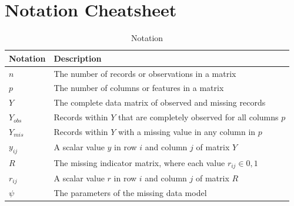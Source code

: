 \documentclass[12pt,oneside]{chicagocapstone}
\begin{document}
\chapter{Notation Cheatsheet}\label{notation-cheatsheet}
\begin{table}[!h]

\caption{\label{tab:appendixbnotation}Notation}
\begin{tabu} to 
\toprule
\begingroup\fontsize{13}{15}\selectfont \textbf{Notation}\endgroup & \begingroup\fontsize{13}{15}\selectfont \textbf{Description}\endgroup\\
\midrule
$n$ & The number of records or observations in a matrix\\
$p$ & The number of columns or features in a matrix\\
$Y$ & The complete data matrix of observed and missing records\\
$Y_{obs}$ & Records within $Y$ that are completely observed for all columns $p$\\
$Y_{mis}$ & Records within $Y$ with a missing value in any column in $p$\\
\addlinespace
$y_{ij}$ & A scalar value $y$ in row $i$ and column $j$ of matrix $Y$\\
$R$ & The missing indicator matrix, where each value $r_{ij} \in 0,1$\\
$r_{ij}$ & A scalar value $r$ in row $i$ and column $j$ of matrix $R$\\
$\psi$ & The parameters of the missing data model\\
\bottomrule
\end{tabu}
\end{table}
\end{document}
